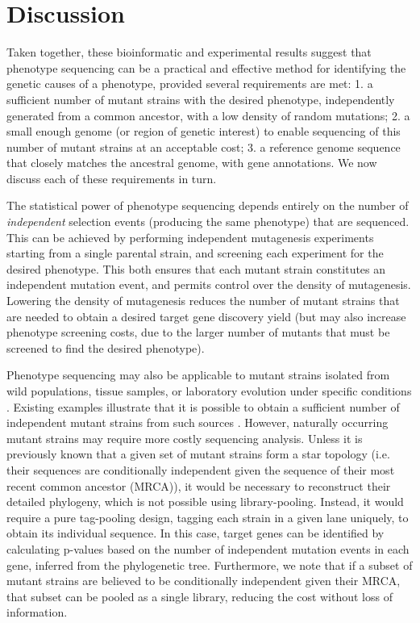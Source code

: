 \documentclass[letterpaper,10pt,english]{howto}
\begin{document}
\section{Discussion}

Taken together, these bioinformatic and experimental results
suggest that phenotype sequencing can be a practical and effective
method for identifying the genetic causes of a phenotype,
provided several requirements are met:
1. a sufficient number of mutant strains with the desired phenotype,
independently generated from a common ancestor, with a low density of
random mutations;
2. a small enough genome (or region of genetic interest) to enable
sequencing of this number of mutant strains at an acceptable cost;
3. a reference genome sequence that closely matches the ancestral
genome, with gene annotations.
We now discuss each of these requirements in turn.

The statistical power of phenotype sequencing depends entirely
on the number of \emph{independent} selection events (producing the same
phenotype) that are sequenced.  This can be achieved
by performing independent mutagenesis experiments starting from a
single parental strain, and screening each experiment for the desired
phenotype.  This both ensures that each mutant strain constitutes
an independent mutation event, and permits control over the density
of mutagenesis.  Lowering the density of mutagenesis reduces the
number of mutant strains that are needed to obtain a desired
target gene discovery yield (but may also increase phenotype screening
costs, due to the larger number of mutants that must be screened
to find the desired phenotype).

Phenotype sequencing may also be applicable to mutant strains
isolated from wild populations, tissue samples, or laboratory
evolution under specific conditions
\cite{Barrick2009a}  \cite{Barrick2009b}  \cite{Conrad2009} .
Existing examples illustrate that it is possible to obtain
a sufficient number of independent mutant strains from such
sources \cite{Conrad2009} .  However, naturally
occurring mutant strains may require more costly sequencing analysis.
Unless it is previously known that a given set of mutant strains form
a star topology (i.e. their sequences are conditionally independent
given the sequence of their most recent common ancestor (MRCA)), it
would be necessary to reconstruct their detailed phylogeny,
which is not possible using library-pooling.
Instead, it would require a pure tag-pooling design,
tagging each strain in a given lane uniquely,
to obtain its individual sequence.
In this case, target genes can be identified by calculating
p-values based on the number of independent mutation events in
each gene, inferred from the phylogenetic tree.  Furthermore, we
note that if a subset of mutant strains are believed to
be conditionally independent given their MRCA, that subset
can be pooled as a single library, reducing the cost
without loss of information.
\end{document}
